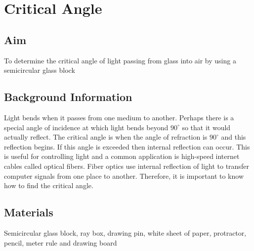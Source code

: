 \chapter{Critical Angle}

\section{Aim}
To determine the critical angle of light passing from glass into air by using a semicircular glass block

\section{Background Information}
Light bends when it passes from one medium to another. Perhaps there is a special angle of incidence at which light bends beyond $90^\circ$ so that it would actually reflect. The critical angle is when the angle of refraction is $90^\circ$ and this reflection begins. If this angle is exceeded then internal reflection can occur. This is useful for controlling light and a common application is high-speed internet cables called optical fibers. Fiber optics use internal reflection of light to transfer computer signals from one place to another. Therefore, it is important to know how to find the critical angle.

\section{Materials}
Semicircular glass block, ray box, drawing pin, white sheet of paper, protractor, pencil, meter rule and drawing board

